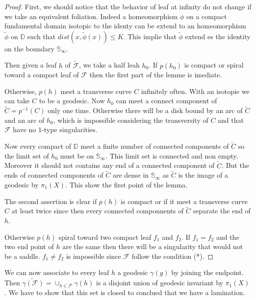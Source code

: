 \begin{proof}
First, we should notice that the behavior of leaf at infinity do not change if we take an equivalent foliation. Indeed a homeomorphism $\phi$ on a compact fundamental domain isotopic to the identy can be extend to an homeomorphism $\tilde{\phi}$ on $\mathbb{D}$ such that $dist(x,\tilde{\phi}(x)) \leq K$. This implie that $\tilde{\phi}$ extend es the identity on the boundary $\mathbb{S}_{\infty}$.

\smallbreak
Then given a leaf $h$ of $\mathcal{\tilde{F}}$, we take a half leah $h_0$. If $p(h_0)$ is compact or spiral toward a compact leaf of $\mathcal{F}$ then the first part of the lemme is imediate.

\smallbreak
Otherwise, $p(h)$ meet a transverse curve $C$ infinitely often. With an isotopie we can take $C$ to be a geodesic. Now $h_0$ can meet a connect component of $\tilde{C}=p^{-1}(C)$ only one time. Otherwise there will be a disk bound by an arc of $\tilde{C}$ and an arc of $h_0$, which is impossible considering the transversity of $C$ and that $\mathcal{F}$ have no $1$-type singularities.

\smallbreak
Now every compact of $\mathbb{D}$ meet a finite number of connected components of $\tilde{C}$ so the limit set of $h_0$ must be on $\mathbb{S}_{\infty}$. This limit set is connected and non empty. Moreover it should not contains any end of a connected component of $\tilde{C}$. But the ends of connected components of $\tilde{C}$ are dense in $\mathbb{S}_{\infty}$ as $\tilde{C}$ is the image of a geodesic by $\pi_1(X)$. This show the first point of the lemma.

\smallbreak
The second assertion is clear if $p(h)$ is compact or if it meet a transverse curve $C$ at least twice since then every connected componnents of $\tilde{C}$ separate the end of $h$.

\smallbreak
Otherwise $p(h)$ spiral toward two compact leaf $f_1$ and $f_2$. If $f_1=f_2$ and the two end point of $h$ are the same then there will be a singularity that would not be a saddle. $f_1 \neq f_2$ is impossible since $\mathcal{F}$ follow the condition (*).
\end{proof}

\smallbreak
We can now associate to every leaf $h$ a geodesic $\gamma(g)$ by joining the endpoint. Then $\tilde{\gamma(\mathcal{F})}= \cup_{h \in \mathcal{F}} \gamma(h)$ is a disjoint union of geodesic invariant by $\pi_1(X)$. We have to show that this set is closed to conclued that we have a lamination.

